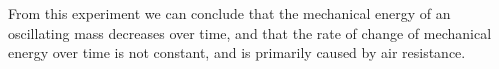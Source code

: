 \documentclass{article}
\begin{document}
        From this experiment we can conclude that the mechanical energy of an oscillating mass decreases over time, and that the rate of change of mechanical energy over time is not constant, and is primarily caused by air resistance.
        
        
        
        
    
    
%    
\end{document}
